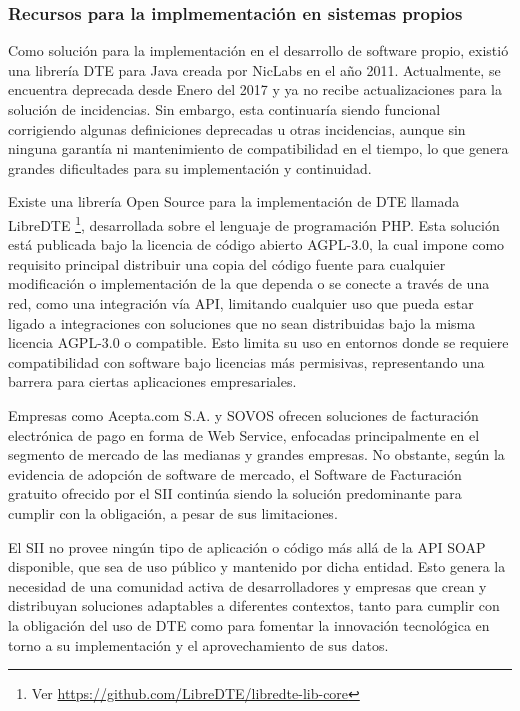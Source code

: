 \subsubsection{Recursos para la implmementación en sistemas propios}

Como solución para la implementación en el desarrollo de software propio, existió una librería DTE para Java creada por NicLabs en el año 2011. Actualmente, se encuentra deprecada desde Enero del 2017 y ya no recibe actualizaciones para la solución de incidencias. Sin embargo, esta continuaría siendo funcional corrigiendo algunas definiciones deprecadas u otras incidencias, aunque sin ninguna garantía ni mantenimiento de compatibilidad en el tiempo, lo que genera grandes dificultades para su implementación y continuidad.

Existe una librería Open Source para la implementación de DTE llamada LibreDTE \textcite{libreDTEGitHub} \footnote{Ver \url{https://github.com/LibreDTE/libredte-lib-core}}, desarrollada sobre el lenguaje de programación PHP. Esta solución está publicada bajo la licencia de código abierto AGPL-3.0, la cual impone como requisito principal distribuir una copia del código fuente para cualquier modificación o implementación de la que dependa o se conecte a través de una red, como una integración vía API, limitando cualquier uso que pueda estar ligado a integraciones con soluciones que no sean distribuidas bajo la misma licencia AGPL-3.0 o compatible. Esto limita su uso en entornos donde se requiere compatibilidad con software bajo licencias más permisivas, representando una barrera para ciertas aplicaciones empresariales.

Empresas como Acepta.com S.A. y SOVOS ofrecen soluciones de facturación electrónica de pago en forma de Web Service, enfocadas principalmente en el segmento de mercado de las medianas y grandes empresas. No obstante, según la evidencia de adopción de software de mercado, el Software de Facturación gratuito ofrecido por el SII continúa siendo la solución predominante para cumplir con la obligación, a pesar de sus limitaciones.

El SII no provee ningún tipo de aplicación o código más allá de la API SOAP disponible, que sea de uso público y mantenido por dicha entidad. Esto genera la necesidad de una comunidad activa de desarrolladores y empresas que crean y distribuyan soluciones adaptables a diferentes contextos, tanto para cumplir con la obligación del uso de DTE como para fomentar la innovación tecnológica en torno a su implementación y el aprovechamiento de sus datos.

